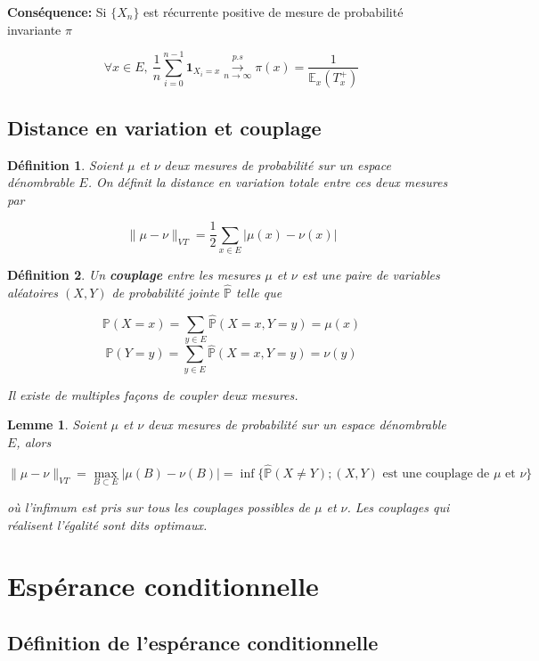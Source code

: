 \documentclass[10pt,a4paper,oneside]{article}
\newtheorem{lemme}{Lemme}
\newtheorem{definition}{Définition}
\begin{document}
\textbf{Conséquence:} Si $\{ X_n \}$ est récurrente positive de mesure de probabilité invariante $\pi$

\[ \forall x \in E,\ \frac{1}{n} \sum_{i = 0}^{n - 1} \textbf{1}_{X_i = x} \overset{p.s}{ \underset{n \to \infty}{\rightarrow} } \pi(x) = \frac{1}{\mathbb{E}_x(T_x^+)} \]

\subsection{Distance en variation et couplage}

\begin{definition}
Soient $\mu$ et $\nu$ deux mesures de probabilité sur un espace dénombrable $E$. On définit la distance en variation totale entre ces deux mesures par

\[ \| \mu - \nu \|_{VT} = \frac{1}{2} \sum_{x \in E} |\mu(x) - \nu(x)| \]
\end{definition}

\begin{definition}
Un \textbf{couplage} entre les mesures $\mu$ et $\nu$ est une paire de variables aléatoires $(X,Y)$ de probabilité jointe $\widehat{\mathbb{P}}$ telle que

\[ \mathbb{P}(X = x) = \sum_{y \in E} \widehat{\mathbb{P}}(X = x,Y = y) = \mu(x) \]
\[ \mathbb{P}(Y = y) = \sum_{y \in E} \widehat{\mathbb{P}}(X = x,Y = y) = \nu(y) \]

Il existe de multiples façons de coupler deux mesures.
\end{definition}

\begin{lemme}
Soient $\mu$ et $\nu$ deux mesures de probabilité sur un espace dénombrable $E$, alors

\[ \| \mu - \nu \|_{VT} = \max_{B \subset E} | \mu(B) - \nu(B) | = \inf \{ \widehat{\mathbb{P}}(X \neq Y); (X,Y) \text{ est une couplage de } \mu \text{ et } \nu \} \]

où l'infimum est pris sur tous les couplages possibles de $\mu$ et $\nu$. Les couplages qui réalisent l'égalité sont dits optimaux.
\end{lemme}

\section{Espérance conditionnelle}

\subsection{Définition de l'espérance conditionnelle}
\end{document}
